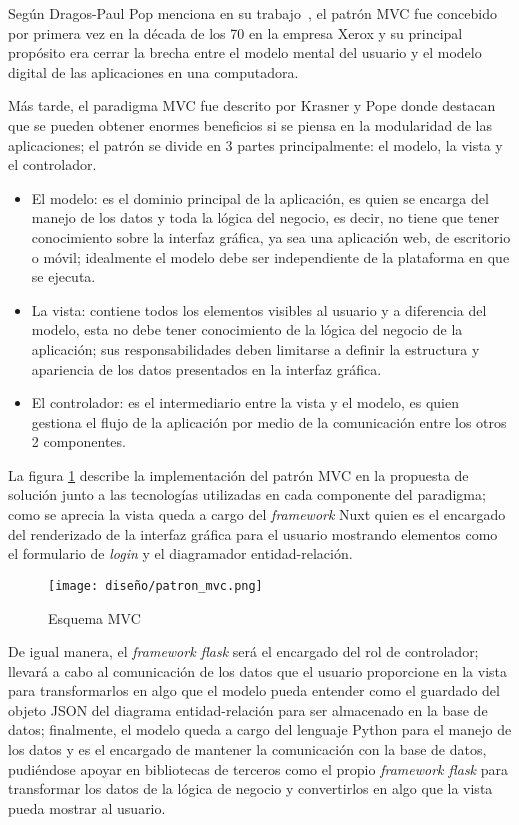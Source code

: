 Según Dragos-Paul Pop menciona en su trabajo~\cite{pop_designing_2014}, el patrón MVC fue concebido por primera vez en la década de los 70 en la empresa Xerox y su principal propósito era cerrar la brecha entre el modelo mental del usuario y el modelo digital de las aplicaciones en una computadora.


Más tarde, el paradigma MVC fue descrito por Krasner y Pope\cite{pope_cookbook_1988} donde destacan que se pueden obtener enormes beneficios si se piensa en la modularidad de las aplicaciones; el patrón se divide en 3 partes principalmente: el modelo, la vista y el controlador.

\begin{itemize}
    \item El modelo: es el dominio principal de la aplicación, es quien se encarga del manejo de los datos y toda la lógica del negocio, es decir, no tiene que tener conocimiento sobre la interfaz gráfica, ya sea una aplicación web, de escritorio o móvil; idealmente el modelo debe ser independiente de la plataforma en que se ejecuta.
    \item La vista: contiene todos los elementos visibles al usuario y a diferencia del modelo, esta no debe tener conocimiento de la lógica del negocio de la aplicación; sus responsabilidades deben limitarse a definir la estructura y apariencia de los datos presentados en la interfaz gráfica.
    \item El controlador: es el intermediario entre la vista y el modelo, es quien gestiona el flujo de la aplicación por medio de la comunicación entre los otros 2 componentes.
\end{itemize}

La figura \ref{img:mvc_implementation} describe la implementación del patrón MVC en la propuesta de solución junto a las tecnologías utilizadas en cada componente del paradigma; como se aprecia la vista queda a cargo del \textit{framework} Nuxt quien es el encargado del renderizado de la interfaz gráfica para el usuario mostrando elementos como el formulario de \textit{login} y el diagramador entidad-relación.

\begin{figure}[H]
  \centering
  \texttt{[image: diseño/patron\_mvc.png]}
  \caption{Esquema MVC}
  \label{img:mvc_implementation}
\end{figure}


De igual manera, el \textit{framework flask} será el encargado del rol de controlador; llevará a cabo al comunicación de los datos que el usuario proporcione en la vista para transformarlos en algo que el modelo pueda entender como el guardado del objeto JSON del diagrama entidad-relación para ser almacenado en la base de datos; finalmente, el modelo queda a cargo del lenguaje Python para el manejo de los datos y es el encargado de mantener la comunicación con la base de datos, pudiéndose apoyar en bibliotecas de terceros como el propio \textit{framework flask} para transformar los datos de la lógica de negocio y convertirlos en algo que la vista pueda mostrar al usuario.

